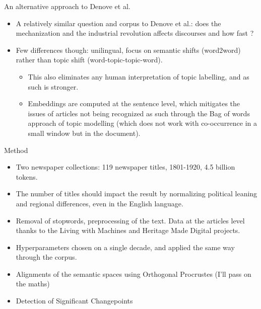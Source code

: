 \documentclass[aspectratio=169]{beamer}
\begin{document}
\begin{frame}{An alternative approach to Denove et al.}
    \begin{itemize}
        \item A relatively similar question and corpus to Denove et al.: does the mechanization and the industrial revolution affects discourses and how fast ?
        \item Few differences though: unilingual, focus on semantic shifts (word2word) rather than topic shift (word-topic-topic-word).
        \begin{itemize}
            \item This also eliminates any human interpretation of topic labelling, and as such is stronger.
            \item Embeddings are computed at the sentence level, which mitigates the issues of articles not being recognized as such through the Bag of words approach of topic modelling (which does not work with co-occurrence in a small window but in the document).
        \end{itemize}
    \end{itemize}
\end{frame}

\begin{frame}{Method}
    \begin{itemize}
        \item Two newspaper collections: 119 newspaper titles, 1801-1920, 4.5 billion tokens.
        \item The number of titles should impact the result by normalizing political leaning and regional differences, even in the English language.
        \item Removal of stopwords, preprocessing of the text. Data at the articles level thanks to the Living with Machines and Heritage Made Digital projects.
        \item Hyperparameters chosen on a single decade, and applied the same way through the corpus.
        \item Alignments of the semantic spaces using Orthogonal Procrustes (I'll pass on the maths)
        \item Detection of Significant Changepoints
    \end{itemize}
\end{frame}
\end{document}

